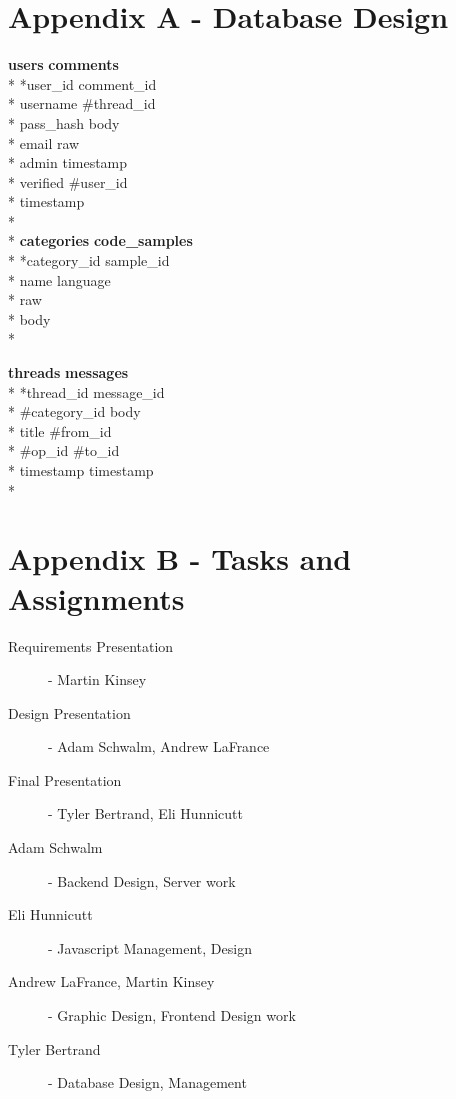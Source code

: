\documentclass[12pt]{scrartcl}
\begin{document}
\newpage

\section{Appendix A - Database Design}

\textbf{users} \hfill \textbf{comments}\\*
*user\_id \hfill *comment\_id\\*
username \hfill \#thread\_id\\*
pass\_hash \hfill body\\*
email \hfill raw\\*
admin \hfill timestamp\\*
verified \hfill \#user\_id\\*
timestamp \\*
\\*
\textbf{categories} \hfill \textbf{code\_samples}\\*
*category\_id \hfill *sample\_id\\*
name \hfill language\\*
\hfill raw\\*
\hfill body\\*

\textbf{threads} \hfill \textbf{messages}\\*
*thread\_id \hfill *message\_id\\*
\#category\_id \hfill body\\*
title \hfill \#from\_id\\*
\#op\_id \hfill \#to\_id\\*
timestamp \hfill timestamp\\*

\section{Appendix B - Tasks and Assignments}
\begin{description}
\item [Requirements Presentation] - Martin Kinsey
\item [Design Presentation] - Adam Schwalm, Andrew LaFrance
\item [Final Presentation] - Tyler Bertrand, Eli Hunnicutt
\vspace{4mm}
\item [Adam Schwalm] - Backend Design, Server work
\item [Eli Hunnicutt] - Javascript Management, Design
\item [Andrew LaFrance, Martin Kinsey] - Graphic Design, Frontend Design work
\item [Tyler Bertrand] - Database Design, Management
\end{description}
\end{document}
